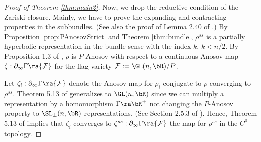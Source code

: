 \begin{proof}[Proof of Theorem  \ref{thm:main2}]
	Now, we drop the reductive condition of the Zariski closure. 
Mainly, we have to prove the expanding and contracting properties in the subbundles. 
(See also the proof of Lemma 2.40 of \cite{GGKW17ii}.)
	By Proposition \ref{prop:PAnosovStrict} and Theorem \ref{thm:bundle}, 
	$\rho^{ss}$ is a partially hyperbolic representation in the bundle sense with the index $k$, $k < n/2$. 
	By Proposition 1.3 of \cite{GGKW17ii}, $\rho$ is $P$-Anosov with respect to 
	a continuous Anosov map $\zeta: \partial_\infty \Gamma \ra {\mathcal{F}}$ for the flag variety 
	$\mathcal{F} := \GL(n, \bR)/P$.

Let $\zeta_i: \partial_\infty \Gamma \ra {\mathcal{F}}$ denote the Anosov map for $\rho_i$ 
conjugate to $\rho$ converging to $\rho^{ss}$. 
Theorem 5.13 of \cite{GW12} generalizes to $\GL(n, \bR)$ 
since we can multiply a representation 
by a homomorphism $\Gamma \ra \bR^+$ not changing the $P$-Anosov property
to $\SL_\pm(n, \bR)$-representations. 
(See Section 2.5.3 of \cite{GGKW17ii}). 
Hence, Theorem 5.13 of \cite{GW12} implies that
$\zeta_i$ converges to $\zeta^{ss}: \partial_\infty \Gamma \ra {\mathcal{F}}$
the map for $\rho^{ss}$ in the $C^0$-topology. 


\end{proof}
